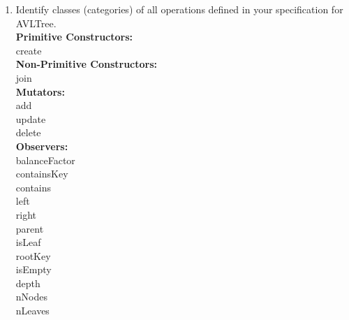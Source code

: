 \documentclass[12pt]{article}
\begin{document}
\begin{spacing}{1.5}
\begin{enumerate}
\item Identify classes (categories) of all operations defined in your specification for AVLTree.\\
\textbf{Primitive Constructors:} \\
create\\
\textbf{Non-Primitive Constructors:} \\
join \\
\textbf{Mutators:} \\
add \\
update \\
delete \\
\textbf{Observers:} \\
balanceFactor \\
containsKey \\
contains\\
left\\
right\\
parent\\
isLeaf\\
rootKey\\
isEmpty\\
depth\\
nNodes\\
nLeaves\\


\end{enumerate}

\end{spacing}
\end{document}

